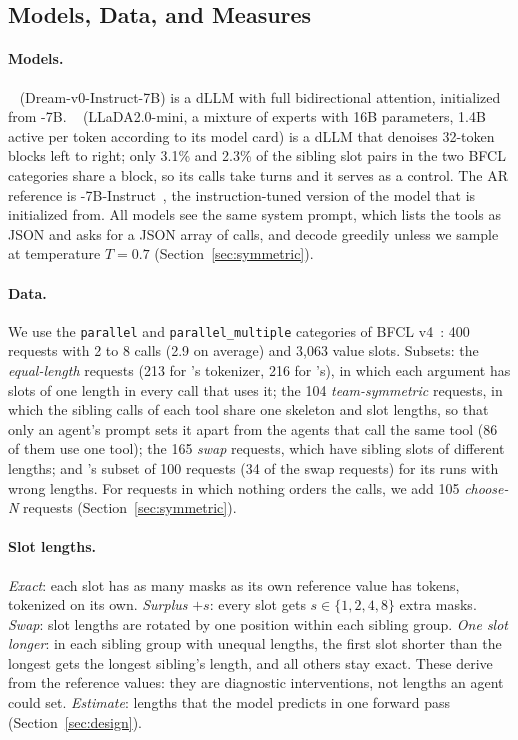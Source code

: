 \subsection{Models, Data, and Measures}
\label{sec:models}

\paragraph{Models.} \dream~\cite{ye2025dream} (Dream-v0-Instruct-7B) is a dLLM with full bidirectional attention, initialized from \qwen-7B. \llada~\cite{bie2025llada2} (LLaDA2.0-mini, a mixture of experts with 16B parameters, 1.4B active per token according to its model card) is a dLLM that denoises 32-token blocks left to right; only 3.1\% and 2.3\% of the sibling slot pairs in the two BFCL categories share a block, so its calls take turns and it serves as a control. The AR reference is \qwen-7B-Instruct~\cite{qwen2024qwen25}, the instruction-tuned version of the model that \dream is initialized from. All models see the same system prompt, which lists the tools as JSON and asks for a JSON array of calls, and decode greedily unless we sample at temperature $T=0.7$ (Section~\ref{sec:symmetric}).

\paragraph{Data.} We use the \texttt{parallel} and \texttt{parallel\_multiple} categories of BFCL v4~\cite{patil2025bfcl}: 400 requests with 2 to 8 calls (2.9 on average) and 3,063 value slots. Subsets: the \emph{equal-length} requests (213 for \dream's tokenizer, 216 for \llada's), in which each argument has slots of one length in every call that uses it; the 104 \emph{team-symmetric} requests, in which the sibling calls of each tool share one skeleton and slot lengths, so that only an agent's prompt sets it apart from the agents that call the same tool (86 of them use one tool); the 165 \emph{swap} requests, which have sibling slots of different lengths; and \llada's subset of 100 requests (34 of the swap requests) for its runs with wrong lengths. For requests in which nothing orders the calls, we add 105 \emph{choose-N} requests (Section~\ref{sec:symmetric}).

\paragraph{Slot lengths.} \emph{Exact}: each slot has as many masks as its own reference value has tokens, tokenized on its own. \emph{Surplus} $+s$: every slot gets $s\in\{1,2,4,8\}$ extra masks. \emph{Swap}: slot lengths are rotated by one position within each sibling group. \emph{One slot longer}: in each sibling group with unequal lengths, the first slot shorter than the longest gets the longest sibling's length, and all others stay exact. These derive from the reference values: they are diagnostic interventions, not lengths an agent could set. \emph{Estimate}: lengths that the model predicts in one forward pass (Section~\ref{sec:design}).

